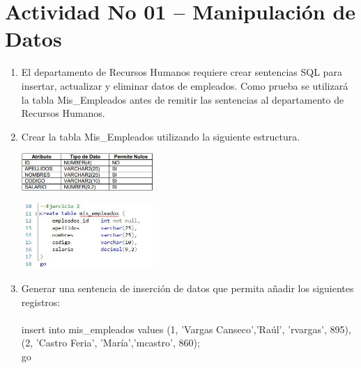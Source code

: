 \section{Actividad No 01 – Manipulaci\'on de Datos} 

\begin{enumerate}[1.]
	\item El departamento de Recursos Humanos requiere crear sentencias SQL para insertar, actualizar y eliminar datos de empleados. Como prueba se utilizará la tabla Mis\_Empleados antes de remitir las sentencias al departamento de Recursos Humanos.

	\item Crear la tabla Mis\_Empleados utilizando la siguiente estructura.
	\begin{center}
	\includegraphics[width=5cm]{./Imagenes/imagen0102} 
	\end{center}
	\begin{center}
	\includegraphics[width=5cm]{./Imagenes/img2} 
	\end{center}
	\item Generar una sentencia de inserción de datos que permita añadir los siguientes registros:
	\\
	\\ insert into mis\_empleados values (1, 'Vargas Canseco','Raúl', 'rvargas', 895),(2, 'Castro Feria',  'María','mcastro', 860);
	\\ go


\end{enumerate}
